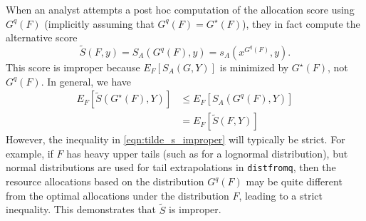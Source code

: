 \documentclass{article}\usepackage[]{graphicx}\usepackage[]{xcolor}
\begin{document}
When an analyst attempts a post hoc computation of the allocation score using $G^q(F)$ (implicitly assuming that $G^q(F)
= G^\star(F)$), they in fact compute the alternative score
$$\tilde{S}(F, y) = S_A(G^q(F), y) = s_A(x^{G^q(F)}, y).$$
This score is improper because $E_{F}[S_A(G, Y)]$ is minimized by $G^\star(F)$, not $G^q(F)$.
In general, we have
\begin{align}
E_{F}[\tilde{S}(G^\star(F), Y)] &\leq E_{F}[ S_A(G^q(F), Y) ] \label{eqn:tilde_s_improper} \\
  &= E_{F}[\tilde{S}(F, Y)] \nonumber
\end{align}
However, the inequality in \eqref{eqn:tilde_s_improper} will typically be strict. For example, if $F$ has heavy upper
tails (such as for a lognormal distribution), but normal distributions are used for tail extrapolations in
\verb`distfromq`, then the resource allocations based on the distribution $G^q(F)$ may be quite different from the
optimal allocations under the distribution $F$, leading to a strict inequality. This demonstrates that $\tilde{S}$ is
improper.


\end{document}
